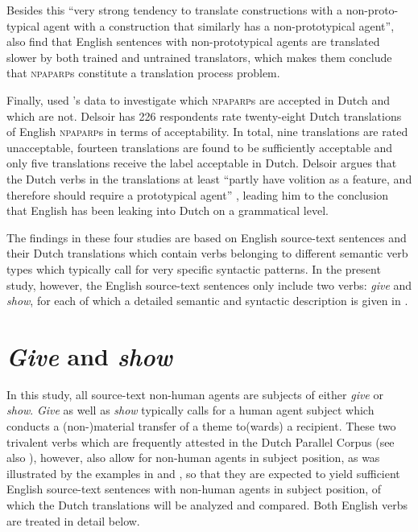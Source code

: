 \documentclass[output=paper]{LSP/langsci}
\begin{document}
Besides this “very strong tendency to translate constructions with a non-proto-typical agent with a construction that similarly has a non-prototypical agent”, \citet[11]{Vandepitte2011} also find that English sentences with non-prototypical agents are translated slower by both trained and untrained translators, which makes them conclude that \textsc{npaparp}s constitute a translation process problem. 

Finally, \citet{Delsoir2011} used \citeauthor{Vandepitte2011}'s \citeyear{Vandepitte2011} data to investigate which \textsc{npaparp}s are accepted in Dutch and which are not. Delsoir has 226 respondents rate twenty-eight Dutch translations of English \textsc{npaparp}s in terms of acceptability. In total, nine translations are rated unacceptable, fourteen translations are found to be sufficiently acceptable and only five translations receive the label acceptable in Dutch. Delsoir argues that the Dutch verbs in the translations at least “partly have volition as a feature, and therefore should require a prototypical agent” \citet[34]{Vandepitte2011}, leading him to the conclusion that English has been leaking into Dutch on a grammatical level. 

The findings in these four studies are based on English source-text sentences and their Dutch translations which contain verbs belonging to different semantic verb types which typically call for very specific syntactic patterns. In the present study, however, the English source-text sentences only include two verbs: \textit{give} and \textit{show}, for each of which a detailed semantic and syntactic description is given in .  

\section{\textit{Give} and \textit{show}} \label{sec:5:4}

In this study, all source-text non-human agents are subjects of either \textit{give} or \textit{show}. \textit{Give} as well as \textit{show} typically calls for a human agent subject which conducts a (non-)material transfer of a theme to(wards) a recipient. These two trivalent verbs which are frequently attested in the Dutch Parallel Corpus (see also ), however, also allow for non-human agents in subject position, as was illustrated by the examples in  and , so that they are expected to yield sufficient English source-text sentences with non-human agents in subject position, of which the Dutch translations will be analyzed and compared. Both English verbs are treated in detail below.  
  
\end{document}
